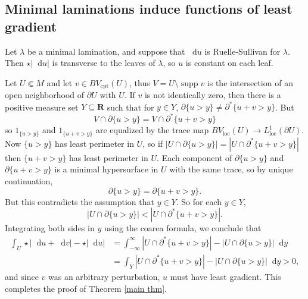 \documentclass[reqno,10pt]{amsart}
\newcommand{\RR}{\mathbf{R}}
\DeclareMathOperator{\supp}{supp}
\newcommand*\dif{\mathop{}\!\mathrm{d}}
\newcommand{\loc}{\mathrm{loc}}
\newcommand{\cpt}{\mathrm{cpt}}
\theoremstyle{definition}
\numberwithin{equation}{section}
\begin{document}

\subsection{Minimal laminations induce functions of least gradient}
Let $\lambda$ be a minimal lamination, and suppose that $\dif u$ is Ruelle-Sullivan for $\lambda$.
Then $\star |\dif u|$ is transverse to the leaves of $\lambda$, so $u$ is constant on each leaf.

Let $U \Subset M$ and let $v \in BV_\cpt(U)$, thus $V = U \setminus \supp v$ is the intersection of an open neighborhood of $\partial U$ with $U$.
If $v$ is not identically zero, then there is a positive measure set $Y \subseteq \RR$ such that for $y \in Y$, $\partial \{u > y\} \neq \partial^* \{u + v > y\}$.
But
$$V \cap \partial \{u > y\} = V \cap \partial^* \{u + v > y\}$$
so $1_{\{u > y\}}$ and $1_{\{u + v > y\}}$ are equalized by the trace map $BV_\loc(U) \to L^1_\loc(\partial U)$.
Now $\{u > y\}$ has least perimeter in $U$, so if $|U \cap \partial \{u > y\}| = |U \cap \partial^* \{u + v > y\}|$ then $\{u + v > y\}$ has least perimeter in $U$.
Each component of $\partial \{u > y\}$ and $\partial \{u + v > y\}$ is a minimal hypersurface in $U$ with the same trace, so by unique continuation,
$$\partial \{u > y\} = \partial \{u + v > y\}.$$
But this contradicts the assumption that $y \in Y$. So for each $y \in Y$,
$$|U \cap \partial \{u > y\}| < |U \cap \partial^* \{u + v > y\}|.$$
Integrating both sides in $y$ using the coarea formula, we conclude that
\begin{align*}
\int_U \star |\dif u + \dif v| - \star |\dif u| &= \int_{-\infty}^\infty |U \cap \partial^* \{u + v > y\}| - |U \cap \partial \{u > y\}| \dif y \\
&= \int_Y |U \cap \partial^* \{u + v > y\}| - |U \cap \partial \{u > y\}| \dif y > 0,
\end{align*}
and since $v$ was an arbitrary perturbation, $u$ must have least gradient.
This completes the proof of Theorem \ref{main thm}.


\printbibliography
\end{document}
